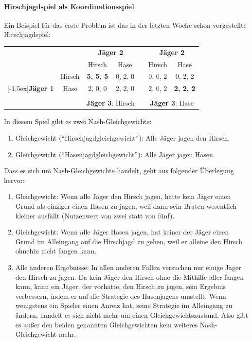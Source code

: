 \paragraph{Hirschjagdspiel als Koordinationsspiel} Ein Beispiel für das erste
Problem ist das in der letzten Woche schon vorgestellte Hirschjagdspiel:
\begin{center}
\begin{tabular}{cc|c|c| c|c|c|}
& \multicolumn{1}{c}{} & \multicolumn{2}{c}{\bf Jäger 2} 
& \multicolumn{1}{c}{} & \multicolumn{2}{c}{\bf Jäger 2} \\
& \multicolumn{1}{c}{} 
& \multicolumn{1}{c}{Hirsch} & \multicolumn{1}{c}{Hase} 
& \multicolumn{1}{c}{} 
& \multicolumn{1}{c}{Hirsch} & \multicolumn{1}{c}{Hase} 
\\ \cline{3-4} \cline{6-7}
& Hirsch   & {\bf 5, 5, 5} & 0, 2, 0 & &  0, 0, 2 & 0, 2, 2 \\
\cline{3-4} \cline{6-7}
\raisebox{1.5ex}[-1.5ex]{{\bf Jäger 1}} 
& Hase     & 2, 0, 0 & 2, 2, 0 & &  2, 0, 2 & {\bf 2, 2, 2} \\
\cline{3-4} \cline{6-7}
\multicolumn{7}{c}{} \\
& \multicolumn{1}{c}{} & \multicolumn{2}{c}{{\small {\bf Jäger 3}: Hirsch}}
& \multicolumn{1}{c}{} & \multicolumn{2}{c}{{\small {\bf Jäger 3}: Hase}} \\
\end{tabular}
\end{center}
In diesem Spiel gibt es zwei Nash-Gleichgewichte: 
\begin{enumerate}
  \item Gleichgewicht ("`Hirschjagdgleichgewicht"'): Alle Jäger jagen den
  Hirsch.
  \item Gleichgewicht ("`Hasenjagdgleichgewicht"'): Alle Jäger jagen Hasen.
\end{enumerate}
Dass es sich um Nash-Gleichgewichte handelt,
geht aus folgender Überlegung hervor: 
\begin{enumerate} 
  \item Gleichgewicht: Wenn alle Jäger den
Hirsch jagen, hätte kein Jäger einen Grund als einziger einen Hasen zu jagen, weil dann sein
Braten wesentlich kleiner ausfällt (Nutzenwert von zwei statt von fünf).
 
\item Gleichgewicht: Wenn alle Jäger Hasen jagen, hat keiner der Jäger einen Grund im
Alleingang auf die Hirschjagd zu gehen, weil er alleine den Hirsch ohnehin nicht fangen kann.

\item Alle anderen Ergebnisse: In allen anderen Fällen versuchen nur einige
Jäger den Hirsch zu jagen. Da kein Jäger den Hirsch ohne die Mithilfe aller
fangen kann, kann ein Jäger, der vorhatte, den Hirsch zu jagen, sein Ergebnis
verbessern, indem er auf die Strategie des Hasenjagens umstellt. Wenn
wenigstens ein Spieler einen Anreiz hat, seine Strategie im Alleingang zu
ändern, handelt es sich nicht mehr um einen Gleichgewichtszustand. Also gibt es
außer den beiden genannten Gleichgewichten kein weiteres Nash-Gleichgewicht
mehr.
\end{enumerate}

